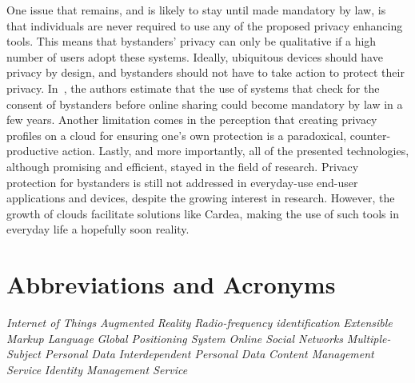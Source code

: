 \documentclass[conference]{IEEEtran}
\begin{document}
One issue that remains, and is likely to stay until made mandatory by law, is that individuals are never required to use any of the proposed privacy enhancing tools. This means that bystanders' privacy can only be qualitative if a high number of users adopt these systems. Ideally, ubiquitous devices should have privacy by design, and bystanders should not have to take action to protect their privacy. In~\cite{olteanu2018consensual}, the authors estimate that the use of systems that check for the consent of bystanders before online sharing could become mandatory by law in a few years. Another limitation comes in the perception that creating privacy profiles on a cloud for ensuring one's own protection is a paradoxical, counter-productive action. Lastly, and more importantly, all of the presented technologies, although promising and efficient, stayed in the field of research. Privacy protection for bystanders is still not addressed in everyday-use end-user applications and devices, despite the growing interest in research. However, the growth of clouds facilitate solutions like Cardea, making the use of such tools in everyday life a hopefully soon reality.


\section*{Abbreviations and Acronyms}
\begin{acronym}[Bash]
 {\textit{Internet of Things}}
 {\textit{Augmented Reality}}
 {\textit{Radio-frequency identification}}
 {\textit{Extensible Markup Language}}
 {\textit{Global Positioning System}}
 {\textit{Online Social Networks}}
 {\textit{Multiple-Subject Personal Data}}
 {\textit{Interdependent Personal Data}}
 {\textit{Content Management Service}}
 {\textit{Identity Management Service}}
\end{acronym}

\printbibliography
\end{document}
